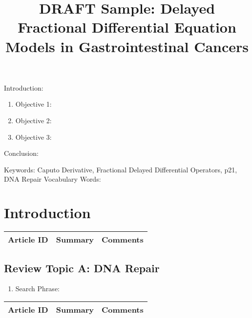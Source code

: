 

\twocolumn
\scriptsize
\begin{frontmatter}
		\title{DRAFT Sample: Delayed Fractional Differential Equation Models in Gastrointestinal Cancers}
		\author{}
		\address{The Mathematical Learning Space}
\end{frontmatter}	

Introduction:
\begin{enumerate}
\item Objective 1:
\item Objective 2:
\item Objective 3:
\end{enumerate}
Conclusion:

Keywords: Caputo Derivative, Fractional Delayed Differential Operators, p21, DNA Repair
Vocabulary Words:

\section{Introduction}

\begin{table}[H]\centering
	\begin{tabular}{p{1cm}p{4cm}p{3cm}}
		Article ID & Summary & Comments\\
		\hline
		\hline
	\end{tabular}
\end{table}

\subsection{Review Topic A: DNA Repair}

\begin{enumerate}
	\item Search Phrase: \cite{key1}
\end{enumerate}

\begin{table}[H]\centering
	\begin{tabular}{p{1cm}p{4cm}p{3cm}}
		Article ID & Summary & Comments\\
		\hline
		\hline
	\end{tabular}
\end{table}

